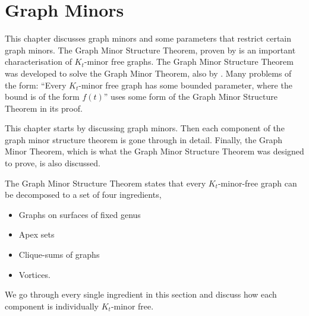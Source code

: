 \chapter{Graph Minors}\label{chap:gmst}
This chapter discusses graph minors and some parameters that restrict certain graph minors. 
The Graph Minor Structure Theorem, proven by \textcite{robertsonGraphMinorsXVI2003} is an important characterisation of $K_t$-minor free graphs. The Graph Minor Structure Theorem was developed to solve the Graph Minor Theorem, also by \textcite{robertsonGraphMinorsXX2004}. Many problems of the form: ``Every $K_t$-minor free graph has some bounded parameter, where the bound is of the form $f(t)$'' uses some form of the Graph Minor Structure Theorem in its proof. 


This chapter starts by discussing graph minors. Then each component of the graph minor structure theorem is gone through in detail. Finally, the Graph Minor Theorem, which is what the Graph Minor Structure Theorem was designed to prove, is also discussed.

The Graph Minor Structure Theorem states that every $K_t$-minor-free graph can be decomposed to a set of four ingredients, 
\begin{itemize}
	\item Graphs on surfaces of fixed genus
	\item Apex sets
	\item Clique-sums of graphs
	\item Vortices.
\end{itemize}
We go through every single ingredient in this section and discuss how each component is individually $K_t$-minor free. 













